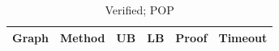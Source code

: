 \begin{table}[htbp]
\centering
\caption{Verified; POP}
\label{tab:p2a-POP-results}
\begin{tabular}{llllll}
\hline
Graph & Method & UB & LB & Proof & Timeout \\
\hline
\hline
\end{tabular}
\end{table}
